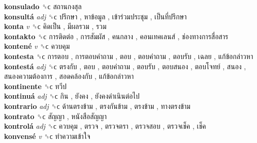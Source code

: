 \textbf{konsulado} ␝ϲ   สถานกงสุล   \\
\textbf{konsultá} \emph{adj}  ␝ϲ   ปรึกษา ,  หาข้อมูล ,  เข้าร่วมประชุม ,  เป็นที่ปรึกษา   \\
\textbf{konta} \emph{v}  ␝ϲ   คิดเป็น ,  มีผลรวม ,  รวม   \\
\textbf{kontakto} ␝ϲ   การติดต่อ ,  การสัมผัส ,  คนกลาง ,  คอนเทคเลนส์ ,  ช่องทางการสื่อสาร   \\
\textbf{kontené} \emph{v}  ␝ϲ   ควบคุม   \\
\textbf{kontesta} ␝ϲ   การตอบ ,  การตอบคำถาม ,  ตอบ ,  ตอบคำถาม ,  ตอบรับ ,  เฉลย ,  แก้ข้อกล่าวหา   \\
\textbf{kontestá} \emph{adj}  ␝ϲ   ตรงกับ ,  ตอบ ,  ตอบคำถาม ,  ตอบรับ ,  ตอบสนอง ,  ตอบโจทย์ ,  สนอง ,  สนองความต้องการ ,  สอดคล้องกับ ,  แก้ข้อกล่าวหา   \\
\textbf{kontinente} ␝ϲ   ทวีป   \\
\textbf{kontinuá} \emph{adj}  ␝ϲ   กิน ,  ยังคง ,  ยังคงดำเนินต่อไป   \\
\textbf{kontrario} \emph{adj}  ␝ϲ   ด้านตรงข้าม ,  ตรงกันข้าม ,  ตรงข้าม ,  ทางตรงข้าม   \\
\textbf{kontrato} ␝ϲ   สัญญา ,  หนังสือสัญญา   \\
\textbf{kontrolá} \emph{adj}  ␝ϲ   ควบคุม ,  ตรวจ ,  ตรวจตรา ,  ตรวจสอบ ,  ตรวจเช็ค ,  เช็ค   \\
\textbf{konvensé} \emph{v}  ␝ϲ   ทำความเข้าใจ   \\
